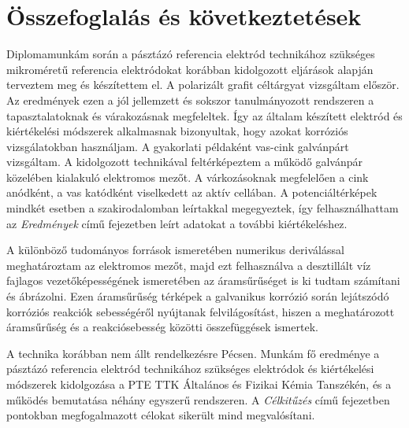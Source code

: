 \chapter{Összefoglalás és következtetések}
\pagestyle{headings}

Diplomamunkám során a pásztázó referencia elektród technikához szükséges mikroméretű referencia elektródokat korábban kidolgozott eljárások alapján terveztem meg és készítettem el. A polarizált grafit céltárgyat vizsgáltam először. Az eredmények ezen a jól jellemzett és sokszor tanulmányozott rendszeren a tapasztalatoknak és várakozásnak megfeleltek. Így az általam készített elektród és kiértékelési módszerek alkalmasnak bizonyultak, hogy azokat korróziós vizsgálatokban használjam. A gyakorlati példaként vas-cink galvánpárt vizsgáltam. A kidolgozott technikával feltérképeztem a működő galvánpár közelében kialakuló elektromos mezőt. A várkozásoknak megfelelően a cink anódként, a vas katódként viselkedett az aktív cellában. A potenciáltérképek mindkét esetben a szakirodalomban leírtakkal megegyeztek, így felhasználhattam az \emph{Eredmények} című fejezetben leírt adatokat a további kiértékeléshez.

A különböző tudományos források ismeretében numerikus deriválással meghatároztam az elektromos mezőt, majd ezt felhasználva a desztillált víz fajlagos vezetőképességének ismeretében az áramsűrűséget is ki tudtam számítani és ábrázolni. Ezen áramsűrűség térképek a galvanikus korrózió során lejátszódó korróziós reakciók sebességéről nyújtanak felvilágosítást, hiszen a meghatározott áramsűrűség és a reakciósebesség közötti összefüggések ismertek.

A technika korábban nem állt rendelkezésre Pécsen. Munkám fő eredménye a pásztázó referencia elektród technikához szükséges elektródok és kiértékelési módszerek kidolgozása a PTE TTK Általános és Fizikai Kémia Tanszékén, és a működés bemutatása néhány egyszerű rendszeren. A \emph{Célkitűzés} című fejezetben pontokban megfogalmazott célokat sikerült mind megvalósítani.
